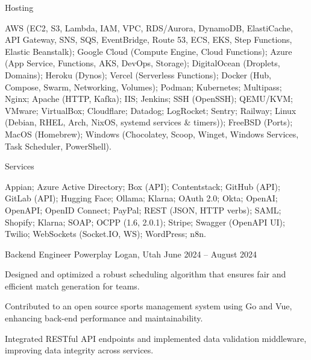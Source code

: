 \documentclass[10pt, a4paper]{russell}
\begin{document}
\begin{cvskills}
    \cvskill
        {Hosting}
        {\parbox[t]{0.99\linewidth}{
            AWS (EC2, S3, Lambda, IAM, VPC, RDS/Aurora, DynamoDB, ElastiCache, API Gateway, SNS, SQS, EventBridge, Route 53, ECS, EKS, Step Functions, Elastic Beanstalk);  
            Google Cloud (Compute Engine, Cloud Functions);  
            Azure (App Service, Functions, AKS, DevOps, Storage);  
            DigitalOcean (Droplets, Domains);  
            Heroku (Dynos);  
            Vercel (Serverless Functions);  
            Docker (Hub, Compose, Swarm, Networking, Volumes);
            Podman;
            Kubernetes;
            Multipass;
            Nginx;  
            Apache (HTTP, Kafka);  
            IIS;  
            Jenkins;  
            SSH (OpenSSH);  
            QEMU/KVM;  
            VMware;  
            VirtualBox;  
            Cloudflare;  
            Datadog;  
            LogRocket;  
            Sentry; 
            Railway;
            Linux (Debian, RHEL, Arch, NixOS, systemd services \& timers));  
            FreeBSD (Ports);  
            MacOS (Homebrew);  
            Windows (Chocolatey, Scoop, Winget, Windows Services, Task Scheduler, PowerShell).
        }}
    
    \cvskill
        {Services}
        {\parbox[t]{0.99\linewidth}{
            Appian;  
            Azure Active Directory;  
            Box (API);  
            Contentstack;  
            GitHub (API);  
            GitLab (API);  
            Hugging Face;  
            Ollama;
            Klarna;  
            OAuth 2.0;  
            Okta;  
            OpenAI;  
            OpenAPI;  
            OpenID Connect;  
            PayPal;  
            REST (JSON, HTTP verbs);  
            SAML;  
            Shopify;  
            Klarna;
            SOAP;  
            OCPP (1.6, 2.0.1);
            Stripe;  
            Swagger (OpenAPI UI);  
            Twilio;  
            WebSockets (Socket.IO, WS);  
            WordPress;
            n8n.
        }}
    
\end{cvskills}

\begin{cventries}

    \cventry
        {Backend Engineer}
        {Powerplay}
        {Logan, Utah}
        {June 2024 – August 2024}
        {
            \begin{cvitems}
                \item Designed and optimized a robust scheduling algorithm that ensures fair and efficient match generation for teams.
                \item Contributed to an open source sports management system using Go and Vue, enhancing back-end performance and maintainability.
                \item Integrated RESTful API endpoints and implemented data validation middleware, improving data integrity across services.
            \end{cvitems}
        }

\end{cventries}
\end{document}
